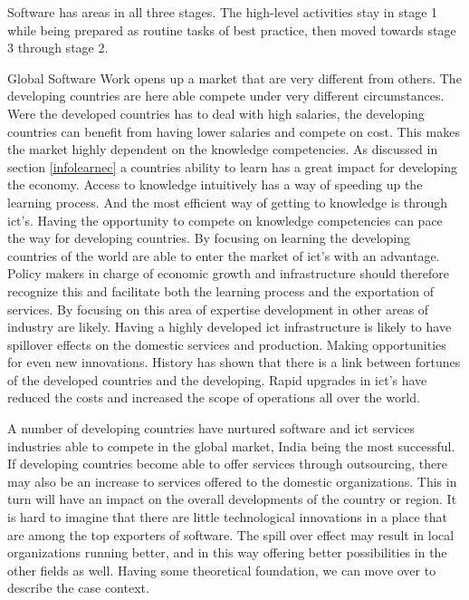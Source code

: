 Software has areas in all three stages. The high-level activities stay in stage 1 while being prepared as routine tasks of best practice, then moved towards stage 3 through stage 2.

Global Software Work opens up a market that are very different from others.
The developing countries are here able compete under very different circumstances.
Were the developed countries has to deal with high salaries, the developing countries can benefit from having lower salaries and compete on cost. 
This makes the market highly dependent on the knowledge competencies. 
As discussed in section \ref{infolearnec} a countries ability to learn has a great impact for developing the economy. 
Access to knowledge intuitively has a way of speeding up the learning process. And the most efficient way of getting to knowledge is through \gls{ict}'s. 
Having the opportunity to compete on knowledge competencies can pace the way for developing countries. 
By focusing on learning the developing countries of the world are able to enter the market of \gls{ict}'s with an advantage. 
Policy makers in charge of economic growth and infrastructure should therefore recognize this and facilitate both the learning process and the exportation of services. 
By focusing on this area of expertise development in other areas of industry are likely.
Having a highly developed \gls{ict} infrastructure is likely to have spillover effects on the domestic services and production. 
Making opportunities for even new innovations. 
History has shown that there is a link between fortunes of the developed countries and the developing. 
Rapid upgrades in \gls{ict}'s have reduced the costs and increased the scope of operations all over the world. 

A number of developing countries have nurtured software and \gls{ict} services industries able to compete in the global market, India being the most successful. 
If developing countries become able to offer services through outsourcing, there may also be an increase to services offered to the domestic organizations. 
This in turn will have an impact on the overall developments of the country or region. 
It is hard to imagine that there are little technological innovations in a place that are among the top exporters of software. 
The spill over effect may result in local organizations running better, and in this way offering better possibilities in the other fields as well.
Having some theoretical foundation, we can move over to describe the case context.
\cite{ca:isdc}
\cite{sbs:gio}
\cite{offit:paan}
